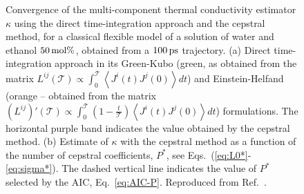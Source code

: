\begin{figure}[!tb]
    \begin{center}
        \hfill
    \end{center}
	\caption{Convergence of the multi-component thermal conductivity estimator $\kappa$ using the direct time-integration approach and the cepstral method, for a classical flexible model of a solution of water and ethanol $50\,\mathrm{mol}\%$, obtained from a $100\,\mathrm{ps}$ trajectory.
    (a) Direct time-integration approach in its Green-Kubo (green, as obtained from the matrix $L^{ij}(\mathcal{T})\propto\int_0^\mathcal{T} \left\langle J^i(t) J^j(0) \right\rangle dt $) and Einstein-Helfand (orange -- obtained from the  matrix $\left (L^{ij}\right )'(\mathcal{T}) \propto  \int_0^\mathcal{T}\left(1-\frac{t}{\mathcal{T}}\right) \left \langle J^i(t) J^j(0) \right \rangle dt$) formulations. The horizontal purple band indicates the value obtained by the cepstral method.
    (b) Estimate of $\kappa$ with the cepstral method as a function of the number of cepstral coefficients, $P^*$, see Eqs.~(\ref{eq:L0*}-\ref{eq:sigma*}). The dashed vertical line indicates the value of $P^*$ selected by the AIC, Eq.~\eqref{eq:AIC-P}. Reproduced from Ref.~\cite{Bertossa2018}.
    }
    \label{fig:twoCompConvergence}
\end{figure}


